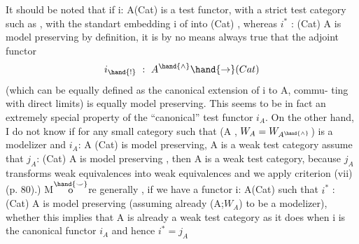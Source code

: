  It should be noted that  if i: A\hand{\ensuremath{\to}}(Cat) is a test functor, 
with a strict test category \hand{(}such as \hand{\ensuremath{\Delta}} ,  with the standart embedding
i of \hand{\ensuremath{\Delta}}  into (Cat) \hand{)},  whereas  $i^*$ : (Cat)\hand{\ensuremath{\to}} A\hand{\ensuremath{^{\wedge}}} is model preserving by 
definition,  it is by no means always true that the  adjoint functor
\[ i_{\hand{!}} \ : \ A^{\hand{\wedge}}\hand{\ensuremath{\to}} (Cat) \]
(which can be equally defined as the canonical extension of i to A\hand{\ensuremath{^{\wedge}}},  commu-%
ting with direct limits)  is equally model preserving.  This seems to be
in fact an extremely special property of  the ``canonical'' test functor $i_A$.
 On the other hand,  I do not know if for any small category  such that
(A\hand{\ensuremath{^{\wedge}}} , $W_A = W_{A^{\hand{\wedge}}}$)  is a modelizer and $i_A$: A\hand{\ensuremath{^{\wedge}}} \hand{\ensuremath{\to}}(Cat)  is model preserving, A
 is a weak test category
 
 
assume that $j_A$: (Cat)\hand{\ensuremath{\to}} A\hand{\ensuremath{^{\wedge}}} is model preserving ,  then A is a weak test
category,  because $j_A$  transforms weak equivalences into weak equivalences
\hand{(}and we apply criterion (vii) (p. 80).) 
 M$\overset{\hand{\smile}}{\mathrm{o}}$re generally ,  if we have a
functor  i:  A\deleted{\hand{\ensuremath{^{\wedge}}}}\hand{\ensuremath{\to}}(Cat)  such that $i^*$ : (Cat)\hand{\ensuremath{\to}} A\hand{\ensuremath{^{\wedge}}} is model preserving
(assuming already (A\hand{\ensuremath{^{\wedge}}};$W_A$) to be a modelizer),   whether this implies that
A is already a weak test category\hand{,}  as it does when i is the canonical
functor $i_A$ and hence $i^* = j_A$   
    
 
